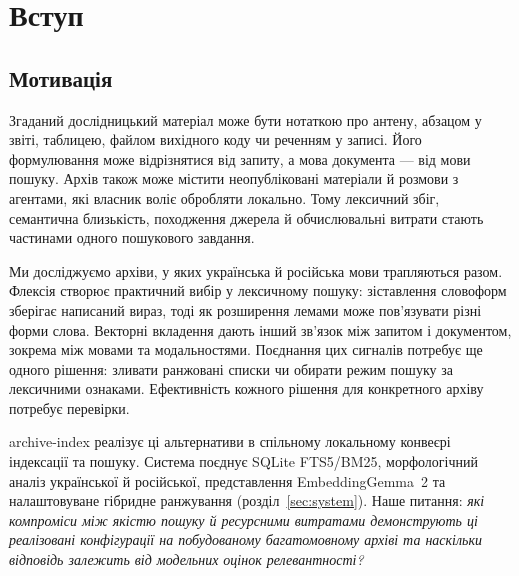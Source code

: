 \section{Вступ}\label{sec:intro}

\subsection{Мотивація}
Згаданий дослідницький матеріал може бути нотаткою про антену, абзацом у звіті, таблицею, файлом вихідного коду чи реченням у записі. Його формулювання може відрізнятися від запиту, а мова документа --- від мови пошуку. Архів також може містити неопубліковані матеріали й розмови з агентами, які власник воліє обробляти локально. Тому лексичний збіг, семантична близькість, походження джерела й обчислювальні витрати стають частинами одного пошукового завдання.

Ми досліджуємо архіви, у яких українська й російська мови трапляються разом. Флексія створює практичний вибір у лексичному пошуку: зіставлення словоформ зберігає написаний вираз, тоді як розширення лемами може пов'язувати різні форми слова. Векторні вкладення дають інший зв'язок між запитом і документом, зокрема між мовами та модальностями. Поєднання цих сигналів потребує ще одного рішення: зливати ранжовані списки чи обирати режим пошуку за лексичними ознаками. Ефективність кожного рішення для конкретного архіву потребує перевірки.

archive-index реалізує ці альтернативи в спільному локальному конвеєрі індексації та пошуку. Система поєднує SQLite FTS5/BM25, морфологічний аналіз української й російської, представлення EmbeddingGemma~2 та налаштовуване гібридне ранжування (розділ~\ref{sec:system}). Наше питання: \emph{які компроміси між якістю пошуку й ресурсними витратами демонструють ці реалізовані конфігурації на побудованому багатомовному архіві та наскільки відповідь залежить від модельних оцінок релевантності?}

